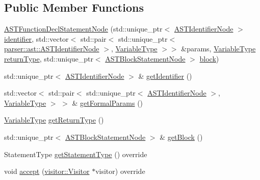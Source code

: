 \subsection*{Public Member Functions}
\begin{DoxyCompactItemize}
\item 
\hyperlink{classparser_1_1ast_1_1ASTFunctionDeclStatementNode_ad03b8fb3eb6f05fa54f78aa362c1f89b}{A\+S\+T\+Function\+Decl\+Statement\+Node} (std\+::unique\+\_\+ptr$<$ \hyperlink{classparser_1_1ast_1_1ASTIdentifierNode}{A\+S\+T\+Identifier\+Node} $>$ \hyperlink{classparser_1_1ast_1_1ASTFunctionDeclStatementNode_a0a989fb6f81a61710fb6dcd0e8f8b627}{identifier}, std\+::vector$<$ std\+::pair$<$ std\+::unique\+\_\+ptr$<$ \hyperlink{classparser_1_1ast_1_1ASTIdentifierNode}{parser\+::ast\+::\+A\+S\+T\+Identifier\+Node} $>$, \hyperlink{ASTVariableDeclStatementNode_8h_a1e8e1bde0729627e3a22ffa858d5f3b9}{Variable\+Type} $>$$>$ \&params, \hyperlink{ASTVariableDeclStatementNode_8h_a1e8e1bde0729627e3a22ffa858d5f3b9}{Variable\+Type} \hyperlink{classparser_1_1ast_1_1ASTFunctionDeclStatementNode_a599bee08b41465e1787471f76069181f}{return\+Type}, std\+::unique\+\_\+ptr$<$ \hyperlink{classparser_1_1ast_1_1ASTBlockStatementNode}{A\+S\+T\+Block\+Statement\+Node} $>$ \hyperlink{classparser_1_1ast_1_1ASTFunctionDeclStatementNode_a9c6e0d925487c0f9b9770de8f84b0377}{block})
\item 
std\+::unique\+\_\+ptr$<$ \hyperlink{classparser_1_1ast_1_1ASTIdentifierNode}{A\+S\+T\+Identifier\+Node} $>$ \& \hyperlink{classparser_1_1ast_1_1ASTFunctionDeclStatementNode_a90b14f42d6e5c0e7ace537bc1ed079c1}{get\+Identifier} ()
\item 
std\+::vector$<$ std\+::pair$<$ std\+::unique\+\_\+ptr$<$ \hyperlink{classparser_1_1ast_1_1ASTIdentifierNode}{A\+S\+T\+Identifier\+Node} $>$, \hyperlink{ASTVariableDeclStatementNode_8h_a1e8e1bde0729627e3a22ffa858d5f3b9}{Variable\+Type} $>$ $>$ \& \hyperlink{classparser_1_1ast_1_1ASTFunctionDeclStatementNode_a21e415e1b48a5f95ce8efff983d35933}{get\+Formal\+Params} ()
\item 
\hyperlink{ASTVariableDeclStatementNode_8h_a1e8e1bde0729627e3a22ffa858d5f3b9}{Variable\+Type} \hyperlink{classparser_1_1ast_1_1ASTFunctionDeclStatementNode_a72b43b1559bc23654e186052d1f3edeb}{get\+Return\+Type} ()
\item 
std\+::unique\+\_\+ptr$<$ \hyperlink{classparser_1_1ast_1_1ASTBlockStatementNode}{A\+S\+T\+Block\+Statement\+Node} $>$ \& \hyperlink{classparser_1_1ast_1_1ASTFunctionDeclStatementNode_ac219fd306035b1f58373b29f80309f4b}{get\+Block} ()
\item 
Statement\+Type \hyperlink{classparser_1_1ast_1_1ASTFunctionDeclStatementNode_af951f3f6b2b47831a252bafe3dcb2a1f}{get\+Statement\+Type} () override
\item 
void \hyperlink{classparser_1_1ast_1_1ASTFunctionDeclStatementNode_ac7648205bc34d4cf7434274869d1b6a8}{accept} (\hyperlink{classvisitor_1_1Visitor}{visitor\+::\+Visitor} $\ast$visitor) override
\end{DoxyCompactItemize}
